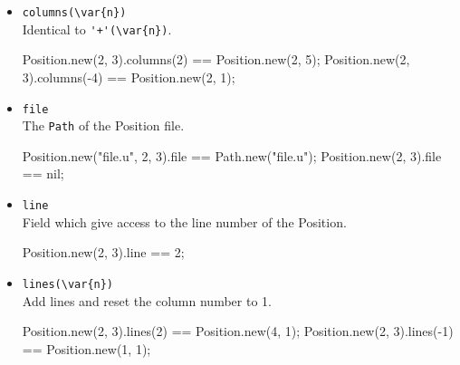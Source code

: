 \begin{itemize}
\item \lstinline|columns(\var{n})|\\
  Identical to \lstinline|'+'(\var{n})|.
\begin{urbiassert}
Position.new(2, 3).columns(2) == Position.new(2, 5);
Position.new(2, 3).columns(-4) == Position.new(2, 1);
\end{urbiassert}

\item \lstinline|file|\\
  The \lstinline|Path| of the Position file.
\begin{urbiassert}
Position.new("file.u", 2, 3).file == Path.new("file.u");
Position.new(2, 3).file == nil;
\end{urbiassert}

\item \lstinline|line|\\
  Field which give access to the line number of the Position.
\begin{urbiassert}
Position.new(2, 3).line == 2;
\end{urbiassert}

\item \lstinline|lines(\var{n})|\\
  Add  lines and reset the column number to 1.
\begin{urbiassert}
Position.new(2, 3).lines(2) == Position.new(4, 1);
Position.new(2, 3).lines(-1) == Position.new(1, 1);
\end{urbiassert}

\end{itemize}


